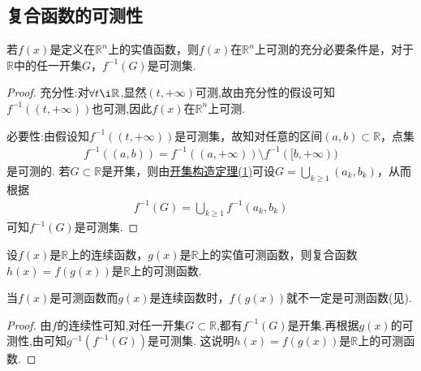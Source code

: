 \documentclass[../../main.tex]{subfiles}%
\begin{document}
\subsection{复合函数的可测性}

\begin{lemma}\label{lemma:函数可测的充要条件1}
若\(f(x)\)是定义在\(\mathbb{R}^{n}\)上的实值函数，则\(f(x)\)在\(\mathbb{R}^{n}\)上可测的充分必要条件是，对于\(\mathbb{R}\)中的任一开集\(G\)，\(f^{-1}(G)\)是可测集.
\end{lemma}
\begin{proof}

{\heiti 充分性:}对$\forall t\i \mathbb{R}$,显然$(t,+\infty)$可测,故由充分性的假设可知$f^{-1}((t,+\infty))$也可测,因此$f(x)$在$\mathbb{R}^n$上可测.

{\heiti 必要性:}由假设知\(f^{-1}((t, +\infty))\)是可测集，故知对任意的区间\((a, b) \subset \mathbb{R}\)，点集
\begin{align*}
f^{-1}((a, b)) = f^{-1}((a, +\infty)) \setminus f^{-1}([b, +\infty))
\end{align*}
是可测的. 若\(G \subset \mathbb{R}\)是开集，则由\hyperref[theorem:开集构造定理]{开集构造定理(1)}可设\(G = \bigcup_{k \geqslant 1} (a_k, b_k)\)，从而根据
\begin{align*}
f^{-1}(G) = \bigcup_{k \geqslant 1} f^{-1}(a_k, b_k)
\end{align*}
可知\(f^{-1}(G)\)是可测集.

\end{proof}

\begin{theorem}\label{theorem:连续函数复合可测函数也可测}
设\(f(x)\)是\(\mathbb{R}\)上的连续函数，\(g(x)\)是\(\mathbb{R}\)上的实值可测函数，则复合函数\(h(x) = f(g(x))\)是\(\mathbb{R}\)上的可测函数.
\end{theorem}
\begin{remark}
当\(f(x)\)是可测函数而\(g(x)\)是连续函数时，\(f(g(x))\)就不一定是可测函数(见).
\end{remark}
\begin{proof}

由$f$的连续性可知,对任一开集\(G \subset \mathbb{R}\),都有\(f^{-1}(G)\)是开集.再根据\(g(x)\)的可测性,由可知\(g^{-1}(f^{-1}(G))\)是可测集. 这说明\(h(x) = f(g(x))\)是\(\mathbb{R}\)上的可测函数. 

\end{proof}
\end{document}

